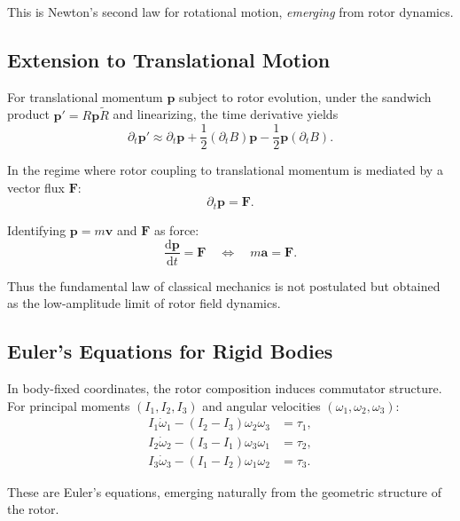 \documentclass[11pt,a4paper]{article}
\numberwithin{equation}{section}
\theoremstyle{plain}
\theoremstyle{definition}
\theoremstyle{remark}
\newcommand{\rev}[1]{\widetilde{#1}}       %
\newcommand{\dd}{\mathrm{d}}
\begin{document}
This is Newton's second law for rotational motion, \emph{emerging} from rotor dynamics.

\subsection{Extension to Translational Motion}

For translational momentum $\mathbf{p}$ subject to rotor evolution, under the sandwich product $\mathbf{p}' = R\mathbf{p}\rev{R}$ and linearizing, the time derivative yields
\begin{equation}
\partial_t \mathbf{p}' \approx \partial_t \mathbf{p} + \frac{1}{2}(\partial_t B)\mathbf{p} - \frac{1}{2}\mathbf{p}(\partial_t B).
\end{equation}

In the regime where rotor coupling to translational momentum is mediated by a vector flux $\mathbf{F}$:
\begin{equation}
\partial_t \mathbf{p} = \mathbf{F}.
\end{equation}

Identifying $\mathbf{p} = m\mathbf{v}$ and $\mathbf{F}$ as force:
\begin{equation}
\boxed{\frac{\dd\mathbf{p}}{\dd t} = \mathbf{F} \quad \Longleftrightarrow \quad m\mathbf{a} = \mathbf{F}.}
\label{eq:newton-translational}
\end{equation}

Thus the fundamental law of classical mechanics is not postulated but obtained as the low-amplitude limit of rotor field dynamics.

\subsection{Euler's Equations for Rigid Bodies}

In body-fixed coordinates, the rotor composition induces commutator structure. For principal moments $(I_1, I_2, I_3)$ and angular velocities $(\omega_1,\omega_2,\omega_3)$:
\begin{align}
I_1\dot{\omega}_1 - (I_2-I_3)\omega_2\omega_3 &= \tau_1,\\
I_2\dot{\omega}_2 - (I_3-I_1)\omega_3\omega_1 &= \tau_2,\\
I_3\dot{\omega}_3 - (I_1-I_2)\omega_1\omega_2 &= \tau_3.
\end{align}

These are Euler's equations, emerging naturally from the geometric structure of the rotor.
\end{document}
